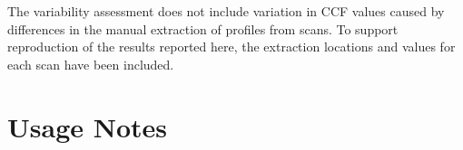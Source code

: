 \documentclass[11pt,a4paper]{article}
\begin{document}
\begin{table}

\caption{\label{tbl-CCF-replicate-staging-acquisition}Comparison of CCF
means and standard deviations across different replicates, stagings, and
acquisition settings. Dashes indicate that the standard deviation is
undefined because only one CCF value is available. Differences between
means were calculated before rounding to three decimal places.}


\end{table}%

The variability assessment does not include variation in CCF values
caused by differences in the manual extraction of profiles from scans.
To support reproduction of the results reported here, the extraction
locations and values for each scan have been included.

\section*{Usage Notes}\label{sec-usage-notes}
\end{document}
